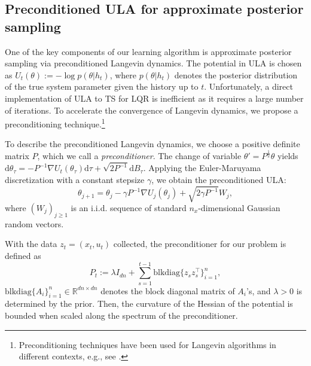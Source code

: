 \documentclass[11pt]{article}
\theoremstyle{plain}
\theoremstyle{definition}
\theoremstyle{remark}
\begin{document}
\subsection{Preconditioned ULA for approximate posterior sampling}

One of the  key components of our learning algorithm is approximate posterior sampling via preconditioned Langevin dynamics. The potential in ULA is chosen as $U_t(\theta) := - \log p( \theta | h_{t})$, where $p (\theta | h_{t})$ denotes the posterior distribution of the true system parameter given the history up to $t$. Unfortunately, a direct implementation of ULA to TS for LQR is inefficient as it requires a large number of iterations. To accelerate the convergence of Langevin dynamics, we propose a preconditioning technique.\footnote{Preconditioning techniques have been used for Langevin algorithms in different contexts, e.g., see \cite{li2016preconditioned, lu2020continuum, bras2022langevin}.}


To describe the preconditioned Langevin dynamics, we choose a positive definite matrix $P$, which we call a \emph{preconditioner}. 
The change of variable $\theta' = P^{\frac{1}{2}}\theta$ yields $
\mathrm{d}\theta_\tau = -{P^{-1}  \nabla U_t (\theta_\tau)}\mathrm{d} \tau + \sqrt{2P^{-1}} \mathrm{d}  B_\tau$. 
Applying the Euler-Maruyama discretization with a constant stepsize $\gamma$, we obtain the preconditioned ULA:
\begin{equation}\label{preULA}
\theta_{j+1} = \theta_j - \gamma P^{-1} \nabla U_j(\theta_j) + \sqrt{2\gamma P^{-1}}  W_j,
\end{equation}
where $(W_j)_{j\geq 1}$ is an i.i.d. sequence of standard $n_x$-dimensional Gaussian random vectors.


With the data $z_t = (x_t, u_t)$ collected, the preconditioner for our problem is defined as
\begin{equation}\label{eq:preconditioner}
P_t:=\lambda I_{dn}+\sum_{s=1}^{t-1} \mathrm{blkdiag}\{z_s z_s^\top\}_{i=1}^n,
\end{equation}
$\mathrm{blkdiag}\{A_i\}_{i=1}^n\in\mathbb{R}^{dn\times dn}$ denotes the block diagonal matrix of $A_i$'s, and $\lambda > 0$ is determined by the prior. 
Then,  the curvature of the Hessian of the potential is
 bounded when scaled along the spectrum of the preconditioner.
\end{document}
